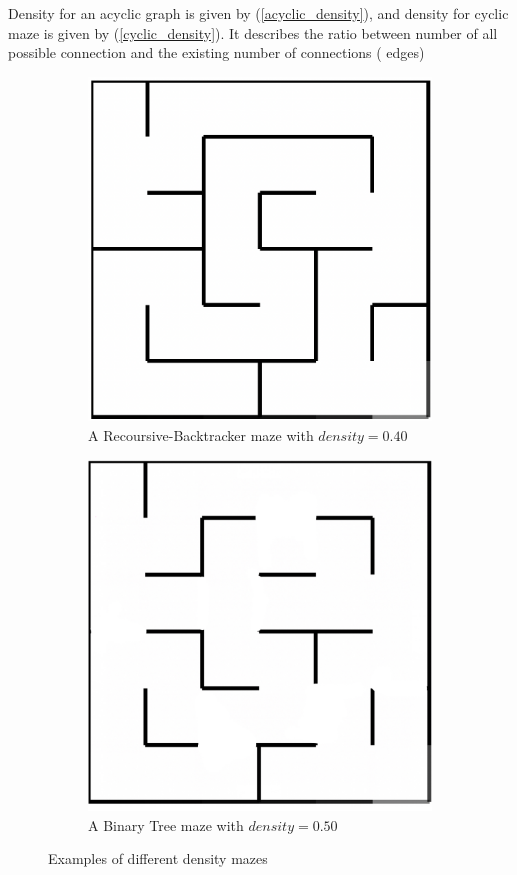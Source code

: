 \begin{description}[style=unboxed]
\begin{figure}[!h]
            \label{fig:test}
            \end{figure}
        \item[Density] Density for an acyclic graph is given by (\ref{acyclic_density}), and density for cyclic maze is given by (\ref{cyclic_density})\cite{SBorg}. It describes the ratio between number of all possible connection and the existing number of connections ( edges) 
        \begin{figure}
            \centering
            \begin{subfigure}{.5\textwidth}
              \centering
              \includegraphics[width=.5\linewidth]{recursivedens}
              \caption{A Recoursive-Backtracker maze with $density = 0.40$}
              \label{fig:sub1}
            \end{subfigure}%
            \begin{subfigure}{.5\textwidth}
              \centering
              \includegraphics[width=.5\linewidth]{recursivedensecyclic}
              \caption{A Binary Tree maze with $density = 0.50$}
              \label{fig:sub2}
            \end{subfigure}
            \caption{Examples of different density mazes}
            \label{fig:test}
            \end{figure}
\end{description}

